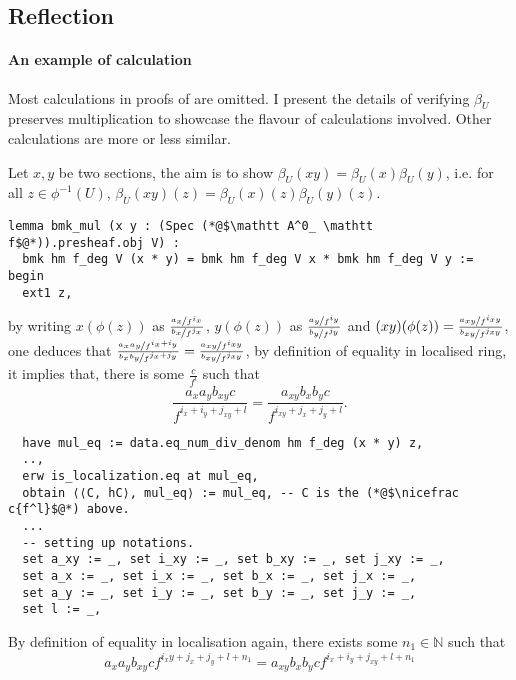 \documentclass[a4paper,UKenglish,cleveref, autoref, thm-restate]{lipics-v2021}
\begin{document}
\subsection{Reflection}

\paragraph*{An example of calculation}
Most calculations in proofs of  are omitted.
I present the details of verifying $\beta_U$ preserves multiplication to showcase the flavour of calculations involved. Other calculations are more or less similar.

Let $x, y$ be two sections, the aim is to show $\beta_U(xy)=\beta_U(x)\beta_U(y)$, i.e. for all $z\in\phi^{-1}(U)$, $\beta_U(xy)(z)=\beta_U(x)(z)\beta_U(y)(z)$.
\begin{lstlisting}
lemma bmk_mul (x y : (Spec (*@$\mathtt A^0_ \mathtt f$@*)).presheaf.obj V) :
  bmk hm f_deg V (x * y) = bmk hm f_deg V x * bmk hm f_deg V y :=
begin
  ext1 z,
\end{lstlisting}
by writing $x(\phi(z))$ as $\frac{\nicefrac{a_x}{f^{i_x}}}{\nicefrac{b_x}{f^{j_x}}}$, $y(\phi(z))$ as $\frac{\nicefrac{a_y}{f^{i_y}}}{\nicefrac{b_y}{f^{j_y}}}$ and $(xy)(\phi(z))=\frac{\nicefrac{a_{xy}}{f^{i_{xy}}}}{\nicefrac{b_{xy}}{f^{j_{xy}}}}$, one deduces that $\frac{\nicefrac{a_xa_y}{f^{i_x+i_y}}}{\nicefrac{b_xb_y}{f^{j_x+j_y}}}=\frac{\nicefrac{a_{xy}}{f^{i_{xy}}}}{\nicefrac{b_{xy}}{f^{j_{xy}}}}$, by definition of equality in localised ring, it implies that, there is some $\frac{c}{f^l}$ such that $$\frac{a_xa_yb_{xy}c}{f^{i_x+i_y+j_{xy}+l}}=\frac{a_{xy}b_xb_yc}{f^{i_{xy}+j_x+j_y+l}}.$$
\begin{lstlisting}
  have mul_eq := data.eq_num_div_denom hm f_deg (x * y) z,
  ..,
  erw is_localization.eq at mul_eq,
  obtain ⟨⟨C, hC⟩, mul_eq⟩ := mul_eq, -- C is the (*@$\nicefrac c{f^l}$@*) above.
  ...
  -- setting up notations.
  set a_xy := _, set i_xy := _, set b_xy := _, set j_xy := _,
  set a_x := _, set i_x := _, set b_x := _, set j_x := _,
  set a_y := _, set i_y := _, set b_y := _, set j_y := _,
  set l := _,
\end{lstlisting}
By definition of equality in localisation again, there exists some $n_1\in \mathbb{N}$ such that
\begin{equation}\label{eqn:example-intermediate}
  a_xa_yb_{xy} c f^{i_xy+j_x+j_y+l+n_1} = a_{xy}b_xb_y c f^{i_x+i_y+j_{xy}+l+n_1}  
\end{equation}
\end{document}
